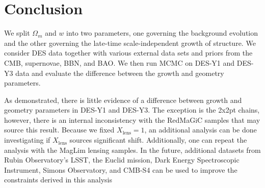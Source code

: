 \section{Conclusion}
We split $\Omega_m$ and $w$ into two parameters, one governing the background evolution and the other governing the late-time scale-independent growth of structure. We consider DES data together with various external data sets and priors from the CMB, supernovae, BBN, and BAO. We then run MCMC on DES-Y1 and DES-Y3 data and evaluate the difference between the growth and geometry parameters. 

As demonstrated, there is little evidence of a difference between growth and geometry parameters in DES-Y1 and DES-Y3. The exception is the 2x2pt chains, however, there is an internal inconsistency with the RedMaGiC samples that may source this result. Because we fixed $X_\mathrm{lens}=1$, an additional analysis can be done investigating if $X_{\mathrm{lens}}$ sources significant shift. Additionally, one can repeat the analysis with the MagLim lensing samples. In the future, additional datasets from Rubin Observatory's LSST, the Euclid mission, Dark Energy Spectroscopic Instrument, Simons Observatory, and CMB-S4 can be used to improve the constraints derived in this analysis

